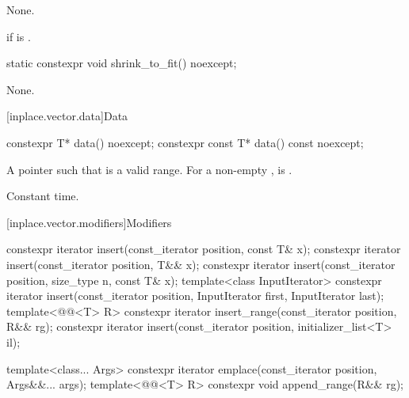 \begin{itemdescr}
\pnum
\effects
None.

\pnum
\throws
{} if  is .
\end{itemdescr}

%
\begin{itemdecl}
static constexpr void shrink_to_fit() noexcept;
\end{itemdecl}

\begin{itemdescr}
\pnum
\effects
None.
\end{itemdescr}

[inplace.vector.data]{Data}

%
\begin{itemdecl}
constexpr       T* data()       noexcept;
constexpr const T* data() const noexcept;
\end{itemdecl}

\begin{itemdescr}
\pnum
\returns
A pointer such that  is a valid range.
For a non-empty ,
 is .

\pnum
\complexity
Constant time.
\end{itemdescr}

[inplace.vector.modifiers]{Modifiers}

%
%
%
%
\begin{itemdecl}
constexpr iterator insert(const_iterator position, const T& x);
constexpr iterator insert(const_iterator position, T&& x);
constexpr iterator insert(const_iterator position, size_type n, const T& x);
template<class InputIterator>
  constexpr iterator insert(const_iterator position, InputIterator first, InputIterator last);
template<@@<T> R>
  constexpr iterator insert_range(const_iterator position, R&& rg);
constexpr iterator insert(const_iterator position, initializer_list<T> il);

template<class... Args>
  constexpr iterator emplace(const_iterator position, Args&&... args);
template<@@<T> R>
  constexpr void append_range(R&& rg);
\end{itemdecl}

